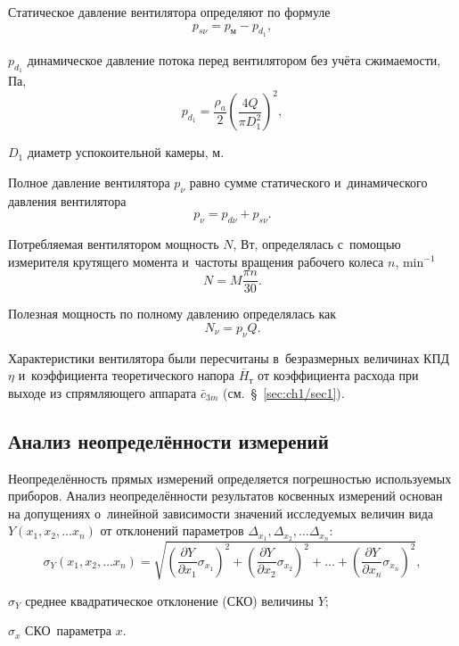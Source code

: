 Статическое давление вентилятора определяют по формуле
\begin{eqnarray}
	p_{s\nu}=p_\text{м}-p_{d_1},
\end{eqnarray}
\begin{eqexpl}
	\item{\(p_{d_1}\)} динамическое давление потока перед вентилятором без учёта сжимаемости, Па,
	\begin{equation*}
		p_{d_1} = \frac{\rho_a}{2} \left(\frac{4Q}{\pi D_1^2} \right)^2,
	\end{equation*}
	\item{\(D_1\)} диаметр успокоительной камеры, м.
\end{eqexpl}

Полное давление вентилятора \(p_{\nu}\) равно сумме статического и~динамического давления вентилятора
\begin{equation}
	p_\nu=p_{d\nu}+p_{s\nu}.
\end{equation}

Потребляемая вентилятором мощность \(N\), Вт, определялась с~помощью измерителя крутящего момента и~частоты вращения рабочего колеса \(n\), \(\si\minute^{-1}\)
\begin{equation}
	N=M \frac{\pi n}{30}.
\end{equation}

Полезная мощность по полному давлению определялась как
\begin{equation}
	N_\nu = p_\nu Q.
	\label{eq:stopExp}
\end{equation}

Характеристики вентилятора были пересчитаны в~безразмерных величинах КПД~\(\eta\) и~коэффициента теоретического напора \(\bar{H}_\text{т}\) от коэффициента расхода при выходе из спрямляющего аппарата \(\bar{c}_{3m}\) (см.~\S~\ref{sec:ch1/sec1}).

\subsection{Анализ неопределённости измерений}

Неопределённость прямых измерений определяется погрешностью используемых приборов.
Анализ неопределённости результатов косвенных измерений основан на допущениях о~линейной зависимости значений исследуемых величин вида \(Y(x_1, x_2, \dots x_n)\) от отклонений параметров \(\Delta_{x_1}, \Delta_{x_2}, \dots \Delta_{x_n}\):
\begin{equation}
	\sigma_Y(x_1, x_2, \dots x_n) = \sqrt{\left(\frac{\partial Y}{\partial{x_1}}\sigma_{x_1}\right)^2 + \left(\frac{\partial Y}{\partial{x_2}}\sigma_{x_2}\right)^2 + \dots + \left(\frac{\partial Y}{\partial{x_n}}\sigma_{x_n}\right)^2},
\end{equation}
\begin{eqexpl}
	\item{\(\sigma_Y\)} среднее квадратическое отклонение (СКО) величины \(Y\);
	\item{\(\sigma_x\)} СКО~параметра \(x\).
\end{eqexpl}

